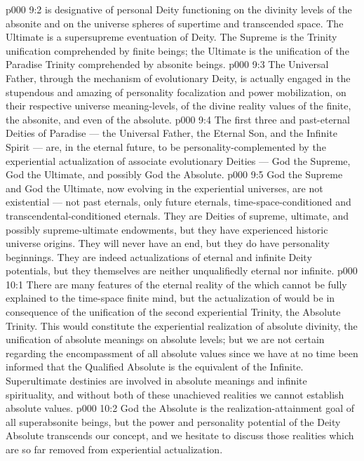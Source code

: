 \vs p000 9:2 \pc {} is designative of personal Deity functioning on the divinity levels of the absonite and on the universe spheres of supertime and transcended space. The Ultimate is a supersupreme eventuation of Deity. The Supreme is the Trinity unification comprehended by finite beings; the Ultimate is the unification of the Paradise Trinity comprehended by absonite beings.
\vs p000 9:3 The Universal Father, through the mechanism of evolutionary Deity, is actually engaged in the stupendous and amazing  of personality focalization and power mobilization, on their respective universe meaning\hyp{}levels, of the divine reality values of the finite, the absonite, and even of the absolute.
\vs p000 9:4 The first three and past\hyp{}eternal Deities of Paradise --- the Universal Father, the Eternal Son, and the Infinite Spirit --- are, in the eternal future, to be personality\hyp{}complemented by the experiential actualization of associate evolutionary Deities --- God the Supreme, God the Ultimate, and possibly God the Absolute.
\vs p000 9:5 \pc God the Supreme and God the Ultimate, now evolving in the experiential universes, are not existential --- not past eternals, only future eternals, time\hyp{}space\hyp{}conditioned and transcendental\hyp{}conditioned eternals. They are Deities of supreme, ultimate, and possibly supreme\hyp{}ultimate endowments, but they have experienced historic universe origins. They will never have an end, but they do have personality beginnings. They are indeed actualizations of eternal and infinite Deity potentials, but they themselves are neither unqualifiedly eternal nor infinite.
\vs p000 10:1 There are many features of the eternal reality of the  which cannot be fully explained to the time\hyp{}space finite mind, but the actualization of  would be in consequence of the unification of the second experiential Trinity, the Absolute Trinity. This would constitute the experiential realization of absolute divinity, the unification of absolute meanings on absolute levels; but we are not certain regarding the encompassment of all absolute values since we have at no time been informed that the Qualified Absolute is the equivalent of the Infinite. Superultimate destinies are involved in absolute meanings and infinite spirituality, and without both of these unachieved realities we cannot establish absolute values.
\vs p000 10:2 God the Absolute is the realization\hyp{}attainment goal of all superabsonite beings, but the power and personality potential of the Deity Absolute transcends our concept, and we hesitate to discuss those realities which are so far removed from experiential actualization.
